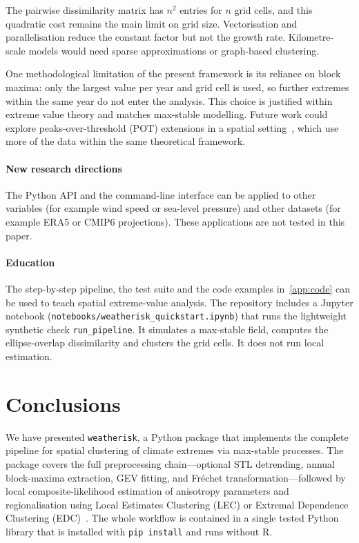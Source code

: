 \documentclass[preprint,12pt,a4paper]{elsarticle}
\newcommand{\revg}[1]{{#1}}
\newcommand{\revo}[1]{{#1}}
\newcommand{\revr}[1]{{#1}}
\begin{document}
\revg{The pairwise dissimilarity matrix has $n^2$ entries for $n$
grid cells, and this quadratic cost remains the main limit on grid
size. Vectorisation and parallelisation reduce the constant factor
but not the growth rate. Kilometre-scale models would need sparse
approximations or graph-based clustering.}

\revg{\revo{One methodological limitation of} the present framework is
its reliance on block maxima\revr{: only the largest value per year
and grid cell is used, so further extremes within the same year do
not enter the analysis}.
This choice is justified within extreme value theory and matches
max-stable modelling. Future work could explore peaks-over-threshold
(POT) extensions in a spatial setting~\cite{davison2012}, which use
more of the data within the same theoretical framework.}

\paragraph{New research directions}
The Python API and the command-line interface can be applied to
other variables (for example wind speed or sea-level pressure) and
other datasets (for example ERA5 or CMIP6 projections). These
applications are not tested in this paper.

\paragraph{Education}
The step-by-step pipeline, the test suite and the code examples in~\ref{app:code} can be used to teach spatial extreme-value analysis.
The repository includes a Jupyter notebook
(\texttt{notebooks/\allowbreak weatherisk\_quickstart.ipynb}) that runs the
lightweight synthetic check \texttt{run\_pipeline}. It simulates a
max-stable field, computes the ellipse-overlap dissimilarity and
clusters the grid cells. It does not run local estimation.

\section{Conclusions}
\label{sec:conclusions}

\revo{We have presented \texttt{weatherisk}, a Python package that
implements the complete pipeline for spatial clustering of climate
extremes via max-stable processes. The package covers the full
preprocessing chain---optional STL detrending, annual block-maxima extraction,
GEV fitting, and Fr\'{e}chet transformation---followed by local
composite-likelihood estimation of anisotropy parameters and
regionalisation using Local Estimates Clustering (LEC) or Extremal
Dependence Clustering (EDC)~\cite{contzen2025}. The whole workflow is
contained in a single tested Python library that is installed with
\texttt{pip install} and runs without R.}
\end{document}
